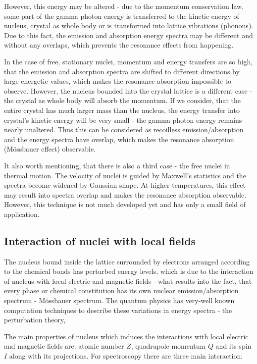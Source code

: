 \par
However, this energy may be altered - due to the  momentum conservation law, some part of the gamma photon energy is transferred to the  kinetic energy of nucleus, crystal as whole body or is transformed into lattice vibrations (phonons). Due to this fact, the emission and absorption energy spectra may be different and without any overlaps, which prevents the resonance effects from happening.

\par
In the case of free, stationary nuclei, momentum and energy transfers are so high, that the emission and absorption spectra are shifted to different directions by large energetic values, which makes the resonance absorption impossible to observe. However, the nucleus bounded into the crystal lattice is a different case - the crystal as whole body will absorb the momentum. If we consider, that the entire crystal has much larger mass than the nucleus, the energy transfer into crystal's kinetic energy will be very small - the gamma photon energy remains nearly unaltered. Thus this can be considered as recoilless emission/absorption and the energy spectra have overlap, which makes the resonance absorption (Mössbauer effect) observable.
\par
It also worth mentioning, that there is also a third case - the free nuclei in thermal motion. The velocity of nuclei is guided by Maxwell's statistics and the spectra become widened by Gaussian shape. At higher temperatures, this effect may result into spectra overlap and makes the resonance absorption observable. However, this technique is not much developed yet and has only a small field of application.

\subsection{Interaction of nuclei with local fields}

The nucleus bound inside the lattice surrounded by electrons arranged according to the chemical bonds has perturbed energy levels, which is due to the interaction of nucleus with local electric and magnetic fields -  what results into the fact, that every phase or chemical constitution has its own nuclear emission/absorption spectrum - Mössbauer spectrum. The quantum physics has very-well known computation techniques to describe these variations in energy spectra - the perturbation theory,

\par
The main properties of nucleus which induces the interactions with local electric and magnetic fields are: atomic number $Z$, quadrupole momentum $Q$ and its spin $I$ along with its projections. For spectroscopy there are three main interaction:

